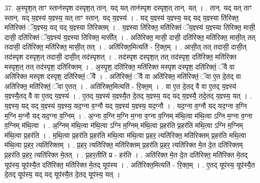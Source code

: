 \documentclass[17pt]{extarticle}
\begin{document}
37. अ॒स्पृ॒श॒त् ताꣳ स्तान॑स्पृश दस्पृश॒त् तान्. यद् यत् तान॑स्पृश दस्पृश॒त् तान्. यत् । . तान्. यद् यत् ताꣳ स्तान्. यद् य॒ज्ञ्स्य॑ य॒ज्ञ्स्य॒ यत् ताꣳ स्तान्. यद् य॒ज्ञ्स्य॑ । . यद् य॒ज्ञ्स्य॑ य॒ज्ञ्स्य॒ यद् यद् य॒ज्ञ्स्या ति॑रिक्त॒ मति॑रिक्तं ॅय॒ज्ञ्स्य॒ यद् यद् य॒ज्ञ्स्या ति॑रिक्तम् । . य॒ज्ञ्स्या ति॑रिक्त॒ मति॑रिक्तं ॅय॒ज्ञ्स्य॑ य॒ज्ञ्स्या ति॑रिक्त॒ मासी॒ दासी॒ दति॑रिक्तं ॅय॒ज्ञ्स्य॑ य॒ज्ञ्स्या ति॑रिक्त॒ मासी᳚त् । . अति॑रिक्त॒ मासी॒ दासी॒ दति॑रिक्त॒ मति॑रिक्त॒ मासी॒त् तत् तदासी॒ दति॑रिक्त॒ मति॑रिक्त॒ मासी॒त् तत् । . अति॑रिक्त॒मित्यति॑ - रि॒क्त॒म् । . आसी॒त् तत् तदासी॒ दासी॒त् तद॑स्पृश दस्पृश॒त् तदासी॒ दासी॒त् तद॑स्पृशत् । . तद॑स्पृश दस्पृश॒त् तत् तद॑स्पृश॒ दति॑रिक्त॒ मति॑रिक्त मस्पृश॒त् तत् तद॑स्पृश॒ दति॑रिक्तम् । . अ॒स्पृ॒श॒ दति॑रिक्त॒ मति॑रिक्त मस्पृश दस्पृश॒ दति॑रिक्तं॒ ॅवै वा अति॑रिक्त मस्पृश दस्पृश॒ दति॑रिक्तं॒ ॅवै । . अति॑रिक्तं॒ ॅवै वा अति॑रिक्त॒ मति॑रिक्तं॒ ॅवा ए॒त दे॒तद् वा अति॑रिक्त॒ मति॑रिक्तं॒ ॅवा ए॒तत् । . अति॑रिक्त॒मित्यति॑ - रि॒क्त॒म् । . वा ए॒त दे॒तद् वै वा ए॒तद् य॒ज्ञ्स्य॑ य॒ज्ञ्स्यै॒तद् वै वा ए॒तद् य॒ज्ञ्स्य॑ । . ए॒तद् य॒ज्ञ्स्य॑ य॒ज्ञ्स्यै॒त दे॒तद् य॒ज्ञ्स्य॒ यद् यद् य॒ज्ञ्स्यै॒ तदे॒तद् य॒ज्ञ्स्य॒ यत् । . य॒ज्ञ्स्य॒ यद् यद् य॒ज्ञ्स्य॑ य॒ज्ञ्स्य॒ यद॒ग्ना व॒ग्नौ यद् य॒ज्ञ्स्य॑ य॒ज्ञ्स्य॒ यद॒ग्नौ । . यद॒ग्ना व॒ग्नौ यद् यद॒ग्ना व॒ग्नि म॒ग्नि म॒ग्नौ यद् यद॒ग्ना व॒ग्निम् । . अ॒ग्ना व॒ग्नि म॒ग्नि म॒ग्ना व॒ग्ना व॒ग्निम् म॑थि॒त्वा म॑थि॒त्वा ऽग्नि म॒ग्ना व॒ग्ना व॒ग्निम् म॑थि॒त्वा । . अ॒ग्निम् म॑थि॒त्वा म॑थि॒त्वा ऽग्नि म॒ग्निम् म॑थि॒त्वा प्र॒हर॑ति प्र॒हर॑ति मथि॒त्वा ऽग्नि म॒ग्निम् म॑थि॒त्वा प्र॒हर॑ति । . म॒थि॒त्वा प्र॒हर॑ति प्र॒हर॑ति मथि॒त्वा म॑थि॒त्वा प्र॒हर॒ त्यति॑रिक्त॒ मति॑रिक्तम् प्र॒हर॑ति मथि॒त्वा म॑थि॒त्वा प्र॒हर॒ त्यति॑रिक्तम् । . प्र॒हर॒ त्यति॑रिक्त॒ मति॑रिक्तम् प्र॒हर॑ति प्र॒हर॒ त्यति॑रिक्त मे॒त दे॒त दति॑रिक्तम् प्र॒हर॑ति प्र॒हर॒ त्यति॑रिक्त मे॒तत् । . प्र॒हर॒तीति॑ प्र - हर॑ति । . अति॑रिक्त मे॒त दे॒त दति॑रिक्त॒ मति॑रिक्त मे॒तद् यूप॑स्य॒ यूप॑स्यै॒त दति॑रिक्त॒ मति॑रिक्त मे॒तद् यूप॑स्य । . अति॑रिक्त॒मित्यति॑ - रि॒क्त॒म् । . ए॒तद् यूप॑स्य॒ यूप॑स्यै॒त दे॒तद् यूप॑स्य॒ यद् यद् यूप॑स्यै॒त दे॒तद् यूप॑स्य॒ यत् । \newline
\pagebreak
{}
\end{document}
